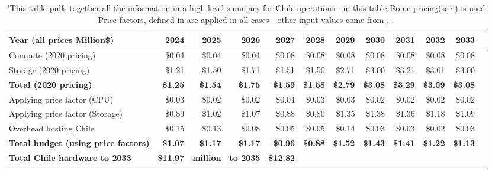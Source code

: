 \tiny \begin{longtable} { |p{}  |r  |r  |r  |r  |r  |r  |r  |r  |r  |r  |r |} 
\caption{"This table pulls together all the information in a high level summary 
for Chile operations - in this table Rome pricing(see 
) is used  Price factors, defined in 
 are applied in all cases - other input values come 
from , . \label{tab:opsChileR}}\\ 
\hline 
\textbf{Year  (all prices Million\$)}&\textbf{2024}&\textbf{2025}&\textbf{2026}&\textbf{2027}&\textbf{2028}&\textbf{2029}&\textbf{2030}&\textbf{2031}&\textbf{2032}&\textbf{2033} \\ \hline
{Compute (2020 pricing)}&{\$0.04}&{\$0.04}&{\$0.04}&{\$0.08}&{\$0.08}&{\$0.08}&{\$0.08}&{\$0.08}&{\$0.08}&{\$0.08} \\ \hline
{Storage (2020 pricing)}&{\$1.21}&{\$1.50}&{\$1.71}&{\$1.51}&{\$1.50}&{\$2.71}&{\$3.00}&{\$3.21}&{\$3.01}&{\$3.00} \\ \hline
\textbf{Total (2020 pricing)}&\textbf{\$1.25}&\textbf{\$1.54}&\textbf{\$1.75}&\textbf{\$1.59}&\textbf{\$1.58}&\textbf{\$2.79}&\textbf{\$3.08}&\textbf{\$3.29}&\textbf{\$3.09}&\textbf{\$3.08} \\ \hline
{Applying price factor (CPU)}&{\$0.03}&{\$0.02}&{\$0.02}&{\$0.04}&{\$0.03}&{\$0.03}&{\$0.02}&{\$0.02}&{\$0.02}&{\$0.02} \\ \hline
{Applying price factor (Storage)}&{\$0.89}&{\$1.02}&{\$1.07}&{\$0.88}&{\$0.80}&{\$1.35}&{\$1.38}&{\$1.36}&{\$1.18}&{\$1.09} \\ \hline
{Overhead hosting Chile}&{\$0.15}&{\$0.13}&{\$0.08}&{\$0.05}&{\$0.05}&{\$0.14}&{\$0.03}&{\$0.03}&{\$0.02}&{\$0.03} \\ \hline
\textbf{Total budget (using price factors)}&\textbf{\$1.07}&\textbf{\$1.17}&\textbf{\$1.17}&\textbf{\$0.96}&\textbf{\$0.88}&\textbf{\$1.52}&\textbf{\$1.43}&\textbf{\$1.41}&\textbf{\$1.22}&\textbf{\$1.13} \\ \hline
\textbf{Total Chile hardware to 2033}&\textbf{\$11.97}&\textbf{million}&\textbf{to 2035}&\textbf{\$12.82}&&&&&& \\ \hline
\end{longtable} \normalsize
